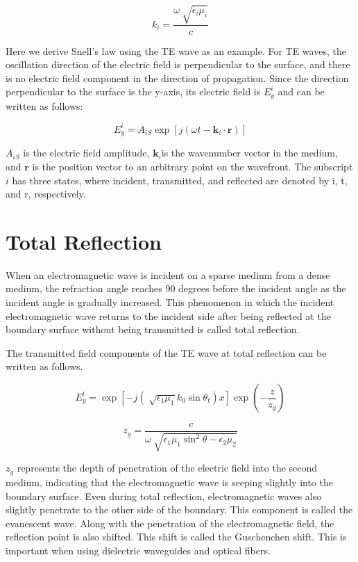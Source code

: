 \documentclass[a4paper,12pt]{report}
\begin{document}
\begin{equation}
  k_i = \frac{\omega\sqrt[]{\dot{\epsilon_i}\mu_i}}{c}
\end{equation}

Here we derive Snell's law using the TE wave as an example.
For TE waves,
the oscillation direction of the electric field is perpendicular to the surface,
and there is no electric field component in the direction of propagation.
Since the direction perpendicular to the surface is the y-axis,
its electric field is $E^i_y$ and can be written as follows:

\begin{equation}
  E^i_y = A_{iS}\exp[j(\omega t - \boldsymbol{k}_i\cdot\boldsymbol{r})]
\end{equation}

$A_{iS}$ is the electric field amplitude,
$\boldsymbol{k}_i$is the wavenumber vector in the medium, and
$\boldsymbol{r}$ is the position vector to an arbitrary point on the wavefront.
The subscript $i$ has three states,
where incident, transmitted, and reflected are denoted by i, t, and r, respectively.

\section{Total Reflection}

When an electromagnetic wave is incident on a sparse medium from a dense medium,
the refraction angle reaches 90 degrees before the incident angle
as the incident angle is gradually increased.
This phenomenon in which the incident electromagnetic wave
returns to the incident side after being reflected
at the boundary surface without being transmitted is called total reflection.

The transmitted field components of the TE wave at total reflection
can be written as follows.


\begin{equation}
  E^t_y = \exp[-j(\sqrt[]{\epsilon_1\mu_1}k_0\sin\theta_t)x]\exp\left(-\frac{z}{z_g}\right)
\end{equation}

\begin{equation}
  z_g = \frac{c}{\omega\sqrt[]{\epsilon_1\mu_1\sin^{2}\theta - \epsilon_2\mu_2}}
\end{equation}

$z_g$ represents the depth of penetration of the electric field into the second medium,
indicating that the electromagnetic wave is seeping slightly into the boundary surface.
Even during total reflection, 
electromagnetic waves also slightly penetrate to the other side of the boundary.
This component is called the evanescent wave.
Along with the penetration of the electromagnetic field,
the reflection point is also shifted.
This shift is called the Guschenchen shift.
This is important when using dielectric waveguides and optical fibers.
\end{document}
